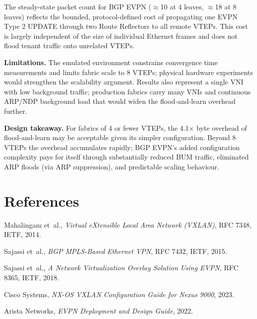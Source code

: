 \documentclass[10pt,twocolumn]{article}
\begin{document}
The steady-state packet count for BGP EVPN ($\approx$10 at 4 leaves,
$\approx$18 at 8 leaves) reflects the bounded, protocol-defined cost of
propagating one EVPN Type 2 UPDATE through two Route Reflectors to all remote
VTEPs.  This cost is largely independent of the size of individual Ethernet
frames and does not flood tenant traffic onto unrelated VTEPs.

\textbf{Limitations.}  The emulated environment constrains convergence time
measurements and limits fabric scale to 8 VTEPs; physical hardware experiments
would strengthen the scalability argument.  Results also represent a single VNI
with low background traffic; production fabrics carry many VNIs and continuous
ARP/NDP background load that would widen the flood-and-learn overhead further.

\textbf{Design takeaway.}  For fabrics of 4 or fewer VTEPs, the 4.1$\times$
byte overhead of flood-and-learn may be acceptable given its simpler
configuration.  Beyond 8 VTEPs the overhead accumulates rapidly; BGP EVPN's
added configuration complexity pays for itself through substantially reduced
BUM traffic, eliminated ARP floods (via ARP suppression), and predictable
scaling behaviour.

\section*{References}
\begin{enumerate}[leftmargin=*, label={[\arabic*]}]
\small
  \item Mahalingam et~al., \emph{Virtual eXtensible Local Area Network
        (VXLAN)}, RFC 7348, IETF, 2014.
  \item Sajassi et~al., \emph{BGP MPLS-Based Ethernet VPN}, RFC 7432,
        IETF, 2015.
  \item Sajassi et~al., \emph{A Network Virtualization Overlay Solution
        Using EVPN}, RFC 8365, IETF, 2018.
  \item Cisco Systems, \emph{NX-OS VXLAN Configuration Guide for Nexus
        9000}, 2023.
  \item Arista Networks, \emph{EVPN Deployment and Design Guide}, 2022.
\end{enumerate}
\end{document}
